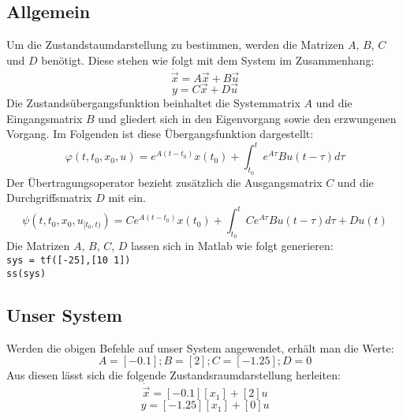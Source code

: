 \subsection{Allgemein}
Um die Zustandstaumdarstellung zu bestimmen, werden die Matrizen $A$, $B$, $C$ und $D$ benötigt. Diese stehen wie folgt mit dem System im Zusammenhang:
\begin{equation*}
  \dot\vec{x} = A\vec{x} + B\vec{u}
\end{equation*}
\begin{equation*}
  y = C\vec{x} + D\vec{u}
\end{equation*}
Die Zustandsübergangsfunktion beinhaltet die Systemmatrix $A$ und die Eingangsmatrix $B$ und gliedert sich in den Eigenvorgang sowie den erzwungenen Vorgang. Im Folgenden ist diese Übergangsfunktion dargestellt:
\begin{equation*}
  \varphi (t,t_0,x_0,u) = e^{A(t-t_0)}x(t_0)+\int_{t_0}^{t}e^{A\tau }Bu(t-\tau )d\tau
\end{equation*}
Der Übertragungsoperator bezieht zusätzlich die Ausgangsmatrix $C$ und die Durchgriffsmatrix $D$ mit ein.
\begin{equation*}
  \psi (t,t_0,x_0,u_{[t_0,t)}) = Ce^{A(t-t_0)}x(t_0)+\int_{t_0}^{t}Ce^{A\tau }Bu(t-\tau )d\tau + Du(t)
\end{equation*}
\vspace*{0.5cm}
Die Matrizen $A$, $B$, $C$, $D$ lassen sich in Matlab wie folgt generieren:\\
\hspace*{0.5cm}\texttt{sys = tf([-25],[10 1])}\\
\hspace*{0.5cm}\texttt{ss(sys)}



\subsection{Unser System}
Werden die obigen Befehle auf unser System angewendet, erhält man die Werte:
\begin{equation*}
  A = [-0.1] ; B = [2] ; C = [-1.25] ; D = 0
\end{equation*}
Aus diesen lässt sich die folgende Zustandsraumdarstellung herleiten:
\begin{equation*}
  \dot \vec{x} = [-0.1][x_1] + [2]u
\end{equation*}
\begin{equation*}
  y = [-1.25][x_1] + [0]u
\end{equation*}